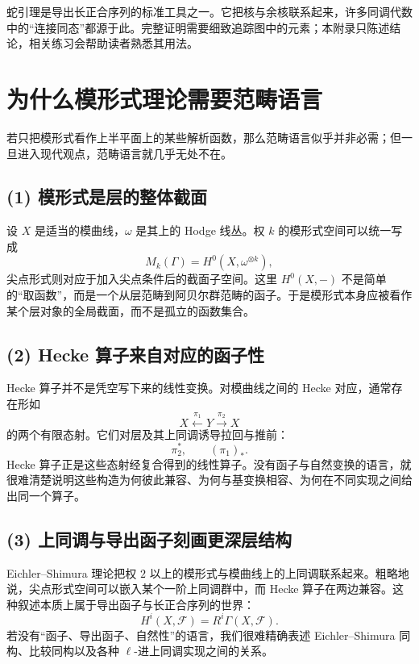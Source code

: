 \begin{remark}
蛇引理是导出长正合序列的标准工具之一。它把核与余核联系起来，许多同调代数中的“连接同态”都源于此。完整证明需要细致追踪图中的元素；本附录只陈述结论，相关练习会帮助读者熟悉其用法。
\end{remark}

\section{为什么模形式理论需要范畴语言}

若只把模形式看作上半平面上的某些解析函数，那么范畴语言似乎并非必需；但一旦进入现代观点，范畴语言就几乎无处不在。

\subsection*{(1) 模形式是层的整体截面}

设 $X$ 是适当的模曲线，$\omega$ 是其上的 Hodge 线丛。权 $k$ 的模形式空间可以统一写成
\[
  M_k(\Gamma) = H^0(X,\omega^{\otimes k}),
\]
尖点形式则对应于加入尖点条件后的截面子空间。这里 $H^0(X,-)$ 不是简单的“取函数”，而是一个从层范畴到阿贝尔群范畴的函子。于是模形式本身应被看作某个层对象的全局截面，而不是孤立的函数集合。

\subsection*{(2) Hecke 算子来自对应的函子性}

Hecke 算子并不是凭空写下来的线性变换。对模曲线之间的 Hecke 对应，通常存在形如
\[
  X \xleftarrow{\pi_1} Y \xrightarrow{\pi_2} X
\]
的两个有限态射。它们对层及其上同调诱导拉回与推前：
\[
  \pi_2^{\ast},\qquad (\pi_1)_{\ast}.
\]
Hecke 算子正是这些态射经复合得到的线性算子。没有函子与自然变换的语言，就很难清楚说明这些构造为何彼此兼容、为何与基变换相容、为何在不同实现之间给出同一个算子。

\subsection*{(3) 上同调与导出函子刻画更深层结构}

Eichler--Shimura 理论把权 $2$ 以上的模形式与模曲线上的上同调联系起来。粗略地说，尖点形式空间可以嵌入某个一阶上同调群中，而 Hecke 算子在两边兼容。这种叙述本质上属于导出函子与长正合序列的世界：
\[
  H^i(X,\mathscr F)=R^i\Gamma(X,\mathscr F).
\]
若没有“函子、导出函子、自然性”的语言，我们很难精确表述 Eichler--Shimura 同构、比较同构以及各种 $\ell$-进上同调实现之间的关系。

